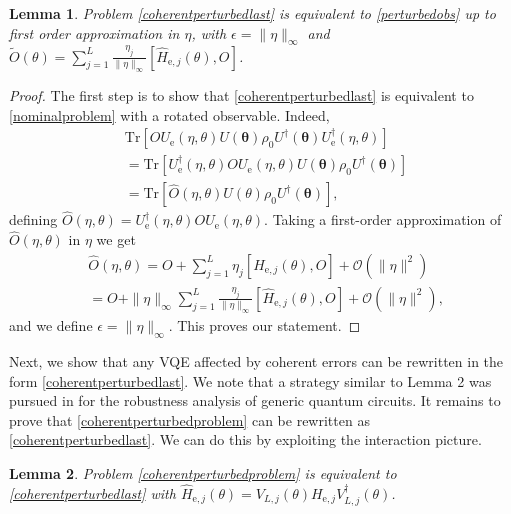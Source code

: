 \documentclass[letterpaper, 10 pt]{IEEEtran}  %
\newcommand{\Tr}{\mathrm{Tr}}
\newtheorem{lemma}{Lemma}
\begin{document}
\begin{lemma}
   Problem \eqref{coherentperturbedlast} is equivalent to \eqref{perturbedobs} up to first order approximation in $\eta$, with $\epsilon=\|\eta\|_\infty$ and
   $\tilde{O}(\theta)=\sum_{j=1}^{L} \frac{\eta_j}{\|\eta\|_\infty} [\hat{H}_{\mathrm{e},j}(\theta), O]$.  
\end{lemma}
\begin{proof}


   The first step is to show that \eqref{coherentperturbedlast} is equivalent to \eqref{nominalproblem} with a rotated observable.
   Indeed, 
   \begin{align}
   & \Tr[O U_\mathrm{e}(\eta, \theta){U}(\mathbf{\theta})\rho_0{U}^\dagger(\mathbf{\theta})U^\dagger_\mathrm{e}(\eta, \theta)] \nonumber\\
   &=\Tr[U^\dagger_\mathrm{e}(\eta, \theta) O U_\mathrm{e}(\eta, \theta){U}(\mathbf{\theta})\rho_0{U}^\dagger(\mathbf{\theta})] \nonumber \\
   &=\Tr[\hat{O}(\eta, \theta)U(\theta)\rho_0{U}^\dagger(\mathbf{\theta})], 
\end{align} 
defining $\hat{O}(\eta, \theta)=U^\dagger_\mathrm{e}(\eta, \theta) O U_\mathrm{e}(\eta, \theta)$.
Taking a first-order approximation of $\hat{O}(\eta, \theta)$ in $\eta$ we get
\begin{align}
   &\hat{O}(\eta, \theta)= O + \sum_{j=1}^{L}\eta_j [\hat{H}_{\mathrm{e},j}(\theta),O]+\mathcal{O}(\|\eta\|^2) \nonumber \\
   &= O + \|\eta\|_\infty \sum_{j=1}^{L}\frac{\eta_j}{\|\eta\|_\infty}[\hat{H}_{\mathrm{e},j}(\theta),O]+\mathcal{O}(\|\eta\|^2), 
\end{align}
and we define $\epsilon=\|\eta\|_\infty$.
This proves our statement.
\end{proof}

Next, we show that any VQE affected by coherent errors can be rewritten in the form \eqref{coherentperturbedlast}.
We note that a strategy similar to Lemma 2 was pursued in \cite{Berberich2025} for the robustness analysis of generic quantum circuits.
It remains to prove that \eqref{coherentperturbedproblem} can be rewritten as \eqref{coherentperturbedlast}. 
We can do this by exploiting the interaction picture. 
\begin{lemma}
   Problem \eqref{coherentperturbedproblem} is equivalent to \eqref{coherentperturbedlast} with 
   $\hat{H}_{\mathrm{e},j}(\theta)=V_{L,j}(\theta)H_{\mathrm{e},j}V_{L,j}^\dagger(\theta)$.
\end{lemma}
\end{document}
